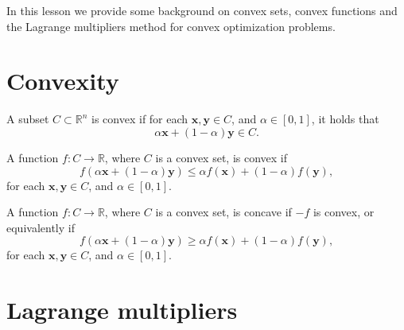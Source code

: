 

\newcommand{\x}{\mathbf{x}}
\newcommand{\y}{\mathbf{y}}
\newcommand{\blambda}{\boldsymbol{\lambda}}
\newcommand{\bmu}{\boldsymbol{\mu}}








In this lesson we provide some background on convex sets, convex functions and the Lagrange multipliers method for convex optimization problems.

\section{Convexity}

\begin{definition} 
A subset $C \subset \mathbb{R}^n$ is convex if for each $\x, \y \in C$, and $\alpha \in [0,1]$, it holds that 
\[\alpha \x + (1-\alpha) \y \in C.\]
\end{definition}

\begin{definition}
A function $f: C \rightarrow \mathbb R$, where $C$ is a convex set, is convex if 
\[ f(\alpha \x + (1-\alpha) \y) \le \alpha f(\x) + (1-\alpha) f(\y), \]
for each $\x, \y \in C$, and $\alpha \in [0,1]$.
\end{definition}

\begin{definition}
A function $f: C \rightarrow \mathbb R$, where $C$ is a convex set, is concave if $-f$ is convex, or equivalently if 
\[ f(\alpha \x + (1-\alpha) \y) \ge \alpha f(\x) + (1-\alpha) f(\y), \]
for each $\x, \y \in C$, and $\alpha \in [0,1]$.
\end{definition}



\section{Lagrange multipliers}

